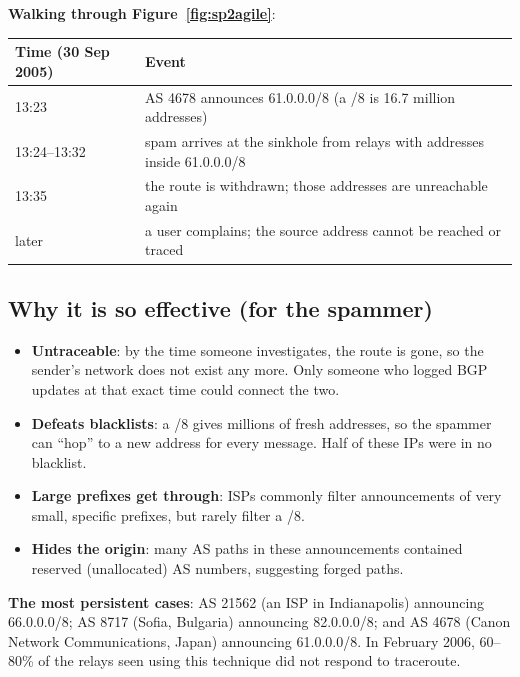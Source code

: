 
\textbf{Walking through Figure~\ref{fig:sp2agile}}:
\begin{center}
\small
\begin{tabular}{@{}ll@{}}
\toprule
Time (30 Sep 2005) & Event\\
\midrule
13:23 & AS 4678 announces 61.0.0.0/8 (a /8 is 16.7 million addresses)\\
13:24--13:32 & spam arrives at the sinkhole from relays with addresses inside 61.0.0.0/8\\
13:35 & the route is withdrawn; those addresses are unreachable again\\
later & a user complains; the source address cannot be reached or traced\\
\bottomrule
\end{tabular}
\end{center}

\subsection{Why it is so effective (for the spammer)}
\begin{itemize}
  \item \textbf{Untraceable}: by the time someone investigates, the route is gone, so the sender's network does not exist any more. Only someone who
        logged BGP updates at that exact time could connect the two.
  \item \textbf{Defeats blacklists}: a /8 gives millions of fresh addresses, so the spammer can ``hop'' to a new address for every message.
        Half of these IPs were in no blacklist.
  \item \textbf{Large prefixes get through}: ISPs commonly filter announcements of very small, specific prefixes, but rarely filter a /8.
  \item \textbf{Hides the origin}: many AS paths in these announcements contained reserved (unallocated) AS numbers, suggesting forged paths.
\end{itemize}

\textbf{The most persistent cases}: AS 21562 (an ISP in Indianapolis) announcing 66.0.0.0/8; AS 8717 (Sofia, Bulgaria) announcing 82.0.0.0/8; and
AS 4678 (Canon Network Communications, Japan) announcing 61.0.0.0/8. In February 2006, 60--80\% of the relays seen using this technique did not
respond to traceroute.


